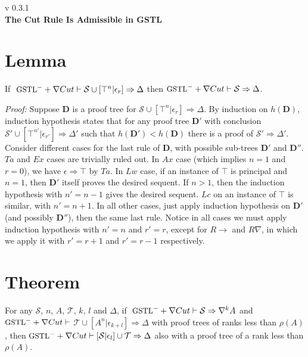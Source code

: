 \documentclass[a4paper, 12pt]{paper}
\begin{document}
{\noindent
	v 0.3.1 \\
{\large\textbf{The Cut Rule Is Admissible in GSTL}}
}
\\
\setcounter{section}{-1}



\section{Lemma}\label{true-assum} If $~\small\text{GSTL}^- + \nabla Cut \vdash \mathcal{S} \cup [\top^n | \epsilon_r] \Rightarrow \Delta$ then $\small\text{GSTL}^- + \nabla Cut \vdash \mathcal{S} \Rightarrow \Delta$.

\textit{Proof:} Suppose $\mathbf{D}$ is a proof tree for $\mathcal{S} \cup [\top^n | \epsilon_r] \Rightarrow \Delta$. By induction on $h(\mathbf{D})$, induction hypothesis states that for any proof tree $\mathbf{D}'$ with conclusion $\mathcal{S'} \cup [\top^{n'} | \epsilon_{r'}] \Rightarrow \Delta'$ such that $h(\mathbf{D}') < h(\mathbf{D})$ there is a proof of $\mathcal{S}' \Rightarrow \Delta'$. Consider different cases for the last rule of $\mathbf{D}$, with possible sub-trees $\mathbf{D}'$ and $\mathbf{D}''$. $Ta$ and $Ex$ cases are trivially ruled out. In $Ax$ case (which implies $n = 1$ and $r = 0$), we have $\epsilon \Rightarrow \top$ by $Ta$. In $Lw$ case, if an instance of $\top$ is principal and $n = 1$, then $\mathbf{D}'$ itself proves the desired sequent. If $n > 1$, then the induction hypothesis with $n' = n - 1$ gives the desired sequent. $Lc$ on an instance of $\top$ is similar, with $n' = n + 1$. In all other cases, just apply induction hypothesis on $\mathbf{D}'$ (and possibly $\mathbf{D}''$), then the same last rule. Notice in all cases we must apply induction hypothesis with $n' = n$ and $r' = r$, except for $R\rightarrow$ and $R\nabla$, in which we apply it with $r' = r + 1$ and $r' = r - 1$ respectively.

\section{Theorem}\label{cut-admis} For any $\mathcal{S}$, $n$, $A$, $\mathcal{T}$, $k$, $l$ and $\Delta$, if $~\small\text{GSTL}^- + \nabla Cut \vdash \mathcal{S} \Rightarrow \nabla^k A$ and $\small\text{GSTL}^- + \nabla Cut \vdash$ $\mathcal{T} \cup [A^n | \epsilon_{k+l}] \Rightarrow \Delta$ with proof trees of ranks less than $\rho(A)$, then
 $\small\text{GSTL}^- + \nabla Cut \vdash [ \mathcal{S} | \epsilon_l ] \cup \mathcal{T} \Rightarrow \Delta$ also with a proof tree of a rank less than $\rho(A)$.
 
\end{document}
